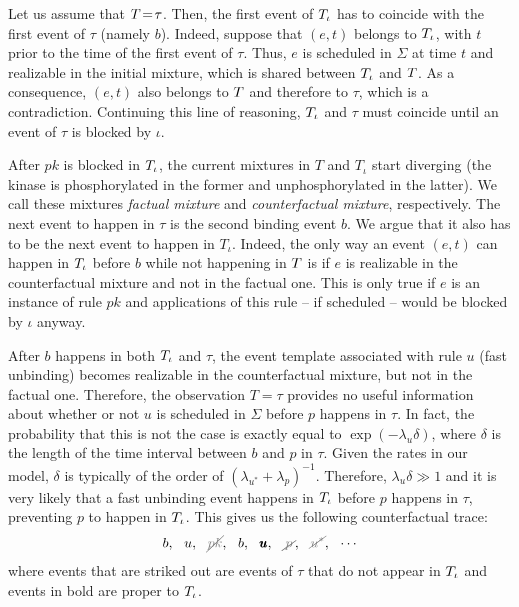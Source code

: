 Let us assume that $T \!=\! \tau$. Then, the first event of
$T_\iota$ has to coincide with the first event of $\tau$ (namely $b$).
Indeed, suppose that $(e, t)$ belongs to $T_\iota$, with $t$ prior to
the time of the first event of $\tau$. Thus, $e$ is scheduled in
$\Sigma$ at time $t$ and realizable in the initial mixture, which is
shared between $T_\iota$ and $T$. As a consequence, $(e, t)$
also belongs to $T$ and therefore to $\tau$, which is a
contradiction. Continuing this line of reasoning, $T_\iota$ and $\tau$
must coincide until an event of $\tau$ is blocked by $\iota$.

After $pk$ is blocked in $T_\iota$, the current mixtures in $T$ and
$T_\iota$ start diverging (the kinase is phosphorylated in the former
and unphosphorylated in the latter). We call these mixtures
\emph{factual mixture} and \emph{counterfactual mixture}, respectively.
The next event to happen in $\tau$ is the second binding event $b$. We
argue that it also has to be the next event to happen in
$T_\iota$. Indeed, the only way an event $(e, t)$ can happen in
$T_\iota$ before $b$ while not happening in $T$ is if $e$ is
realizable in the counterfactual mixture and not in the factual
one. This is only true if $e$ is an instance of rule $pk$ and
applications of this rule -- if scheduled -- would be blocked by
$\iota$ anyway.

After $b$ happens in both $T_\iota$ and $\tau$, the event template
associated with rule $u$ (fast unbinding) becomes realizable in the
counterfactual mixture, but not in the factual one. Therefore, the
observation $T\!=\!\tau$ provides no useful information about whether
or not $u$ is scheduled in $\Sigma$ before $p$ happens in $\tau$. In
fact, the probability that this is not the case is exactly equal to
$\exp(-\lambda_u\delta)$, where $\delta$ is the length of the time
interval between $b$ and $p$ in $\tau$. Given the rates in our model,
$\delta$ is typically of the order of
$(\lambda_{u^*}+\lambda_p)^{-1}$. Therefore, $\lambda_u\delta \gg 1$
and it is very likely that a fast unbinding event happens in $T_\iota$
before $p$ happens in $\tau$, preventing $p$ to happen in $T_\iota$.
This gives us the following counterfactual trace:
\begin{align}
  \label{counterfactual-trace} 
  b,\ \ u,\ \ \strikeout{pk}, \ \ b, \ \ \pmb{u}, \ \ \strikeout{\,p\,}, 
  \ \ \strikeout{u^*}, \ \ \cdots
\end{align} 
where events that are striked out are events of $\tau$ that do not
appear in $T_\iota$ and events in bold are proper to $T_\iota$.


